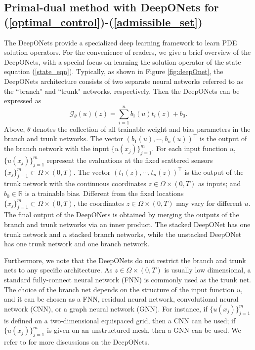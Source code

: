 \documentclass[final]{siamart171218}
\theoremstyle{remark}
\begin{document}
\subsection{Primal-dual method with DeepONets for (\ref{optimal_control})-(\ref{admissible_set})}
The DeepONets \cite{lu2021learning} provide a specialized deep learning framework to learn PDE solution operators.  For the convenience of readers, we give a brief overview of the
DeepONets, with a special focus on learning the solution operator of the state equation (\ref{state_eqn}).
 Typically, as shown in Figure \ref{fig:deepOnet}, the DeepONets architecture consists of two separate neural networks referred to as the ``branch" and ``trunk"
 networks, respectively. Then the DeepONets can be expressed as
$$
\mathcal{G}_{\theta}(u)(z)=\sum_{i=1}^nb_i(u)t_i(z)+b_0.
$$
Above, $\theta$ denotes the collection of all trainable weight and bias parameters in the branch and trunk networks. The vector $(b_1(u) , \cdots , b_n(u) )^\top$ is the output of the branch network with the input $\{u(x_j)\}_{j=1}^m$. For each input function $u$, $\{u(x_j)\}_{j=1}^m$ represent the evaluations at the fixed scattered sensors $\{x_j\}_{j=1}^m\subset\Omega\times(0,T)$. The vector $(t_1(z) , \cdots, t_n(z))^\top$ is the output of the trunk network with the continuous coordinates $z\in \Omega\times (0,T)$ as inputs; and $b_0 \in \mathbb{R}$ is a trainable bias.  Different from the fixed
locations $\{x_j\}_{j=1}^m\subset\Omega\times(0,T)$, the coordinates $z\in \Omega\times(0,T)$ may vary for different $u$. The
final output of the DeepONets is obtained by merging the outputs of the branch and trunk networks via an inner product.   The stacked DeepONet has one trunk network and $n$ stacked branch networks, while the unstacked DeepONet has one trunk network and one branch network.

Furthermore, we note that the DeepONets do not restrict the branch and trunk nets to any specific architecture. As $z\in \Omega\times(0,T)$ is usually low dimensional, a standard fully-connect neural network (FNN) is commonly used as the trunk net. The choice of the branch net depends on the structure of the input function $u$, and it can be chosen as a FNN, residual neural network, convolutional neural network (CNN), or a graph neural network (GNN).
For instance, if $\{u(x_j)\}_{j=1}^m$ is defined on a two-dimensional equispaced grid, then a CNN can be used; if $\{u(x_j)\}_{j=1}^m$  is given on an unstructured mesh, then a GNN can be used.
We refer to \cite{lu2021learning,lucomparison2022} for more discussions on the DeepONets.
\end{document}
